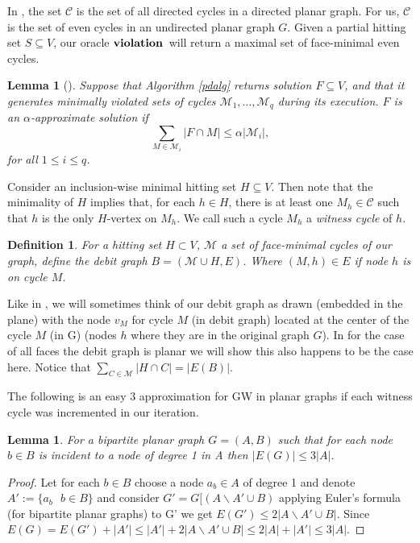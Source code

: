 \documentclass[letterpaper,11pt]{article}
\newcommand{\cmd}[1]{\ensuremath{\mbox{\bf #1}}}
\newcommand{\vio}{\ensuremath{\cmd{violation}}}
\newtheorem{lemma}[theorem]{Lemma}
\newtheorem{definition}[theorem]{Definition}
\newcommand{\MM}{{\mathcal M}}
\newcommand{\CC}{{\ensuremath{\mathcal C}}}
\newcommand{\0}{\mathbb{0}}
\newcommand{\1}{\mathbb{1}}
\begin{document}
\medskip

In \cite{GW98}, the set $\mathcal{C}$ is the set of all directed cycles in a directed planar graph. For us, $\mathcal{C}$ is the set of even cycles in an undirected planar graph $G$. Given a partial hitting set $S \subseteq V$, our oracle \vio\ will return a maximal set of face-minimal even cycles. 
\begin{lemma}[\cite{GW98}]\label{approx} 
Suppose that Algorithm \ref{pdalg} returns solution $F \subseteq V$, and that it generates minimally violated sets of cycles $\MM_1, \ldots, \MM_q$ during its execution.
$F$ is an $\alpha$-approximate solution if 
\[ \sum_{M \in \MM_i} |F \cap M| \leq \alpha|\MM_i|,
 \] 
for all $1 \leq i \leq q$.
\end{lemma}

Consider an inclusion-wise minimal hitting set $H \subseteq V$. Then note that the minimality of $H$ implies that, for each $h \in H$, there is at least one $M_h \in \CC$ such that $h$ is the only $H$-vertex on $M_h$. We call such a cycle $M_h$ a {\em witness cycle} of $h$. 

\begin{definition}
For a hitting set $H \subset V$, $ \mathcal{M} $ a set of face-minimal cycles of our graph, define  the debit graph $B= ( \mathcal{M} \cup H, E  ) $. Where $ (M,h) \in E $ if node $h$ is on cycle $M$.  
\end{definition} 
Like in \cite{GW98},  we will sometimes think of our debit graph as drawn (embedded in the plane) with the node $v_M$ for cycle $M$ (in debit graph) located at the center of the cycle $M$ (in G) (nodes $h$ where they are in the original graph $G$).       In \cite{GW98}   for the case of all faces the debit graph is planar we will show this also happens to be the case here.
Notice that $\sum_{C \in \mathcal{M} } |H \cap C| = |E(B) |.
 $  %

The following is an easy 3 approximation for GW in planar graphs if each witness cycle was incremented in our iteration.

\begin{lemma}\label{debit}
For a bipartite planar graph $G= (A ,B) $ such that for each node $b  \in B $ is incident to a node of degree 1 in A then $|E(G) | \leq  3|A| $.
\end{lemma}
\begin{proof}
Let for each $b \in B$ choose a node $a_b \in A$  of degree 1 and denote $ A' := \{ a_b  \ \ \ b \in B  \} $ and consider $ G' = G[ (A \backslash A' \cup B) $ applying Euler's formula (for bipartite planar graphs) to G' we get $E(G') \leq 2 |A \backslash A' \cup B|$. Since  $E(G) = E(G')+ | A'| \leq  |A'|+ 2 |A \backslash A' \cup B|  \leq 2|A|+ |A'| \leq 3|A|$.
\end{proof}  
\end{document}
